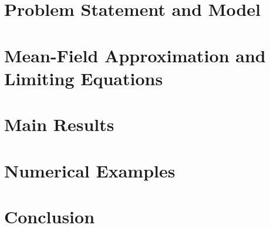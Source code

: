 \section{Problem Statement and Model}
\label{sec:model}


\section{Mean-Field Approximation and Limiting Equations}
\label{sec:meanfield}




\section{Main Results}
\label{sec:results}




\section{Numerical Examples}
\label{sec:numerical}


\section{Conclusion}
\label{sec:conclusion}




\appendix






